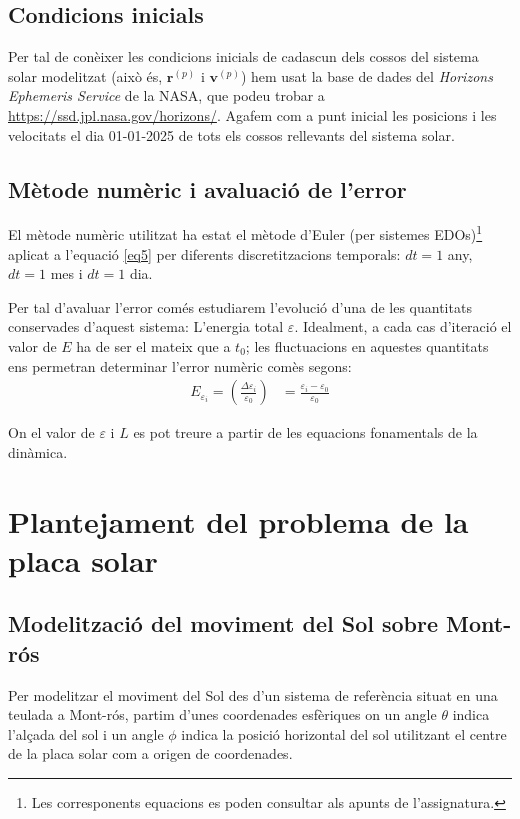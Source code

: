\documentclass[10pt, twoside, a4paper]{article}
\begin{document}
\subsection{Condicions inicials}
Per tal de conèixer les condicions inicials de cadascun dels cossos del sistema solar modelitzat (això és, $\mathbf{r}^{(p)}$ i $\mathbf{v}^{(p)}$) hem usat la base de dades del \textit{Horizons Ephemeris Service} de la NASA, que podeu trobar a \url{https://ssd.jpl.nasa.gov/horizons/}. Agafem com a punt inicial les posicions i les velocitats el dia 01-01-2025 de tots els cossos rellevants del sistema solar.

\subsection{Mètode numèric i avaluació de l'error}
El mètode numèric utilitzat ha estat el mètode d'Euler (per sistemes EDOs)\footnote{Les corresponents equacions es poden consultar als apunts de l'assignatura.} aplicat a l'equació \eqref{eq5} per diferents discretitzacions temporals: $dt = 1$ any, $dt = 1$ mes i $dt = 1$ dia.

Per tal d'avaluar l'error comés estudiarem l'evolució d'una de les quantitats conservades d'aquest sistema: L'energia total $\varepsilon$. Idealment, a cada cas d'iteració el valor de $E$ ha de ser el mateix que a $t_0$; les fluctuacions en aquestes quantitats ens permetran determinar l'error numèric comès segons:
\begin{align}
    E_{\varepsilon_i} = \left( \frac{\Delta \varepsilon_i}{\varepsilon_0} \right) & = \frac{\varepsilon_i - \varepsilon_0}{\varepsilon_0} 
\end{align}

On el valor de $\varepsilon$ i $L$ es pot treure a partir de les equacions fonamentals de la dinàmica.

\section{Plantejament del problema de la placa solar}

\subsection{Modelització del moviment del Sol sobre Mont-rós}
Per modelitzar el moviment del Sol des d'un sistema de referència situat en una teulada a Mont-rós, partim d'unes coordenades esfèriques on un angle $\theta$ indica l'alçada del sol i un angle $\phi$ indica la posició horizontal del sol utilitzant el centre de la placa solar com a origen de coordenades.
\end{document}
